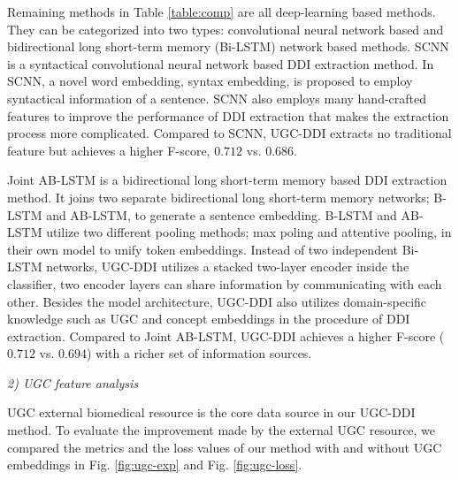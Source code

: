 \documentclass[conference]{IEEEtran}
\begin{document}
Remaining methods in Table \ref{table:comp} are all deep-learning based methods.
They can be categorized into two types: convolutional neural network based and bidirectional long short-term memory (Bi-LSTM) network based methods.
SCNN \cite{zhao_drug_2016} is a syntactical convolutional neural network based DDI extraction method.
In SCNN, a novel word embedding, syntax embedding, is proposed to employ syntactical information of a sentence.
SCNN also employs many hand-crafted features to improve the performance of DDI extraction that makes the extraction process more complicated.
Compared to SCNN, UGC-DDI extracts no traditional feature but achieves a higher F-score, $0.712$ vs. $0.686$.

Joint AB-LSTM is a bidirectional long short-term memory based DDI extraction method.
It joins two separate bidirectional long short-term memory networks; B-LSTM and AB-LSTM, to generate a sentence embedding.
B-LSTM and AB-LSTM utilize two different pooling methods; max poling and attentive pooling, in their own model to unify token embeddings.
Instead of two independent Bi-LSTM networks, UGC-DDI utilizes a stacked two-layer encoder inside the classifier,
two encoder layers can share information by communicating with each other.
Besides the model architecture, UGC-DDI also utilizes domain-specific knowledge such as UGC and concept embeddings in the procedure of DDI extraction.
Compared to Joint AB-LSTM, UGC-DDI achieves a higher F-score ($0.712$ vs. $0.694$) with a richer set of information sources.

\bigbreak
\emph{2) UGC feature analysis}
\bigbreak

UGC external biomedical resource is the core data source in our UGC-DDI method.
To evaluate the improvement made by the external UGC resource, we compared the metrics and the loss values of our method
with and without UGC embeddings in Fig. \ref{fig:ugc-exp} and Fig. \ref{fig:ugc-loss}.
\end{document}
